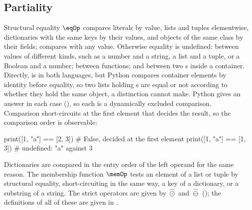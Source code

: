 \subsection{Partiality}
\label{sec:partiality}



Structural equality $\eqOp$ compares literals by value, lists and tuples elementwise, dictionaries with
the same keys by their values, and objects of the same class by their fields;  compares
with any value. Otherwise equality is undefined: between values of different kinds, such as a number and a
string, a list and a tuple, or a Boolean and a number; between functions; and between two
s inside a container. Directly,  is  in both languages,
but Python compares container elements by identity before equality, so two lists holding s
are equal or not according to whether they hold the same object, a distinction \PurePy cannot make.
Python gives an answer in each case (), so each is a dynamically excluded comparison. Comparison short-circuits at the first element that
decides the result, so the comparison order is observable:

\begin{python}
print([1, "a"] == [2, 3])  # False, decided at the first element
print([1, "a"] == [1, 3])  # undefined: "a" against 3
\end{python}

\noindent Dictionaries are compared in the entry order of the left operand for the same reason. The membership
function $\memOp$ tests an element of a list or tuple by structural equality, short-circuiting in the same
way, a key of a dictionary, or a substring of a string. The strict operators are given by
$\hat{\odot}$ and $\hat{\ominus}$ (); the definitions of all of these are given in
\specification.


